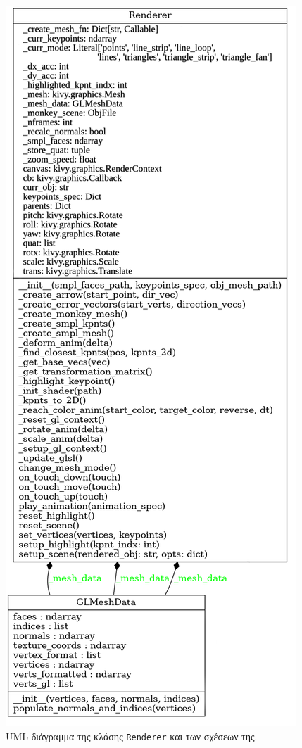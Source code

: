 \begin{figure}[H]
	\centering
	\includegraphics[scale=0.4]{images/chapter5/renderer_uml.png}
	\caption{UML διάγραμμα της κλάσης \texttt{Renderer} και των σχέσεων της.}
	\label{fig:renderer_uml}
\end{figure}

